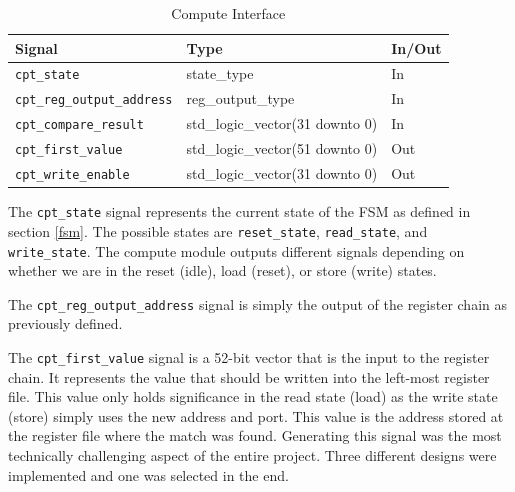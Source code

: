 \documentclass{article}
\begin{document}
\begin{table}[ht]
    \begin{center}
        \begin{tabular}{lll}\hline
        Signal & Type & In/Out \\
        \hline
        \texttt{cpt\_state} & state\_type & In \\
        \hline
        \texttt{cpt\_reg\_output\_address} & reg\_output\_type & In \\
        \hline
        \texttt{cpt\_compare\_result} & std\_logic\_vector(31 downto 0) & In \\
        \hline
        \texttt{cpt\_first\_value} & std\_logic\_vector(51 downto 0) & Out \\
        \hline
        \texttt{cpt\_write\_enable} & std\_logic\_vector(31 downto 0) & Out \\
        \hline
        \end{tabular}
        \caption{Compute Interface}\label{tab:compute}
    \end{center}
\end{table}

The \texttt{cpt\_state} signal represents the current state of the FSM as defined in section \ref{fsm}. The possible states are \texttt{reset\_state}, \texttt{read\_state}, and \texttt{write\_state}. The compute module outputs different signals depending on whether we are in the reset (idle), load (reset), or store (write) states.

The \texttt{cpt\_reg\_output\_address} signal is simply the output of the register chain as previously defined.

The \texttt{cpt\_first\_value} signal is a 52-bit vector that is the input to the register chain. It represents the value that should be written into the left-most register file. This value only holds significance in the read state (load) as the write state (store) simply uses the new address and port. This value is the address stored at the register file where the match was found. Generating this signal was the most technically challenging aspect of the entire project. Three different designs were implemented and one was selected in the end.
\end{document}
